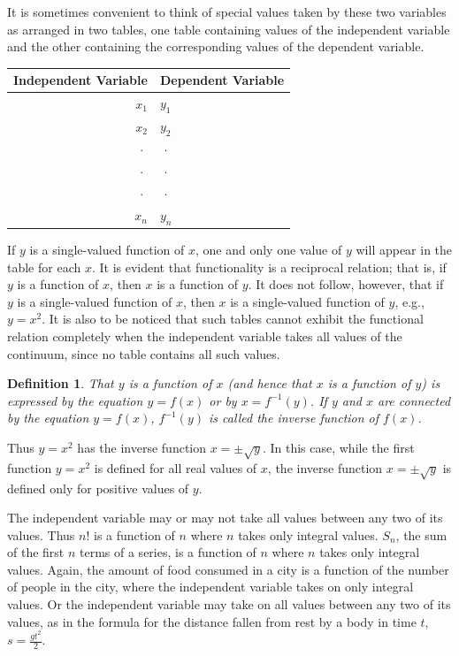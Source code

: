\documentclass[a4paper,12pt]{book}[2004/02/16]
\theoremstyle{ilemma}
\theoremstyle{itheorem}
\theoremstyle{iother}
\theoremstyle{icorollary}
\theoremstyle{numcorollary}
\theoremstyle{idefinition}
\newtheorem*{definition}{Definition}
\renewcommand{\dfrac}[2]{\frac{#1}{#2}}%
\begin{document}
It is sometimes convenient to think of special values taken by these
two variables as arranged in two tables, one table containing values
of the independent variable and the other containing the corresponding
values of the dependent variable.
\begin{center}
\begin{tabular}{r|l}
  Independent Variable & Dependent Variable\\
  \hline
  $x_1$ & $y_1$\\
  $x_2$ & $y_2$\\
  $\,\cdot\,$ & $\,\cdot\,$ \\
  $\,\cdot\,$ & $\,\cdot\,$\\
  $\,\cdot\,$ & $\,\cdot\,$\\
  $x_n$ & $y_n$
\end{tabular}
\end{center}

If $y$ is a single-valued function of $x$, one and only one value of
$y$ will appear in the table for each $x$. It is evident that
functionality is a reciprocal relation; that is, if $y$ is a function
of $x$, then $x$ is a function of $y$. It does not follow, however,
that if $y$ is a single-valued function of $x$, then $x$ is a
single-valued function of $y$, e.g., $y=x^2$. It is also to be noticed
that such tables cannot exhibit the functional relation completely
when the independent variable takes all values of the continuum, since
no table contains all such values.

\begin{definition}\label{dp45}
That $y$ is a function of $x$ (and hence that $x$ is a function of
$y$) is expressed by the equation $y=f(x)$ or by $x=f^{-1}(y)$. If $y$
and $x$ are connected by the equation $y=f(x)$, $f^{-1}(y)$ is called
the inverse function of $f(x)$.
\end{definition}

Thus $y=x^2$ has the inverse function $x=\pm\sqrt y$. In this case,
while the first function $y=x^2$ is defined for all real values of
$x$, the inverse function $x = \pm\sqrt y$ is defined only for
positive values of $y$.

The independent variable may or may not take all values between any
two of its values. Thus $n!$ is a function of $n$ where $n$ takes only
integral values. $S_n$, the sum of the first
$n$ terms of a series, is a function of $n$ where $n$ takes only
integral values. Again, the amount of food consumed in a city is a
function of the number of people in the city, where the independent
variable takes on only integral values. Or the independent variable
may take on all values between any two of its values, as in the
formula for the distance fallen from rest by a body in time $t$,
$s=\dfrac{gt^2}{2}$.
\end{document}
